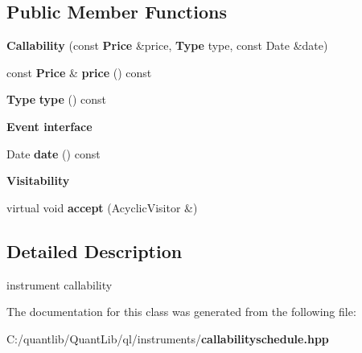 \subsection*{Public Member Functions}
\begin{DoxyCompactItemize}
\item 
{\bfseries Callability} (const {\bf Price} \&price, {\bf Type} type, const Date \&date)\label{class_quant_lib_1_1_callability_ad228bde23a2d0b46caebd1ea15fd30c5}

\item 
const {\bf Price} \& {\bfseries price} () const \label{class_quant_lib_1_1_callability_a6adadeb5414e06999c297d531730dc21}

\item 
{\bf Type} {\bfseries type} () const \label{class_quant_lib_1_1_callability_a9be4cb1b8e8355bdf035408972e098fa}

\end{DoxyCompactItemize}
\begin{Indent}{\bf Event interface}\par
\begin{DoxyCompactItemize}
\item 
Date {\bfseries date} () const \label{class_quant_lib_1_1_callability_a219712d701b779bf8c69c73f2c20e2e8}

\end{DoxyCompactItemize}
\end{Indent}
\begin{Indent}{\bf Visitability}\par
\begin{DoxyCompactItemize}
\item 
virtual void {\bfseries accept} (Acyclic\+Visitor \&)\label{class_quant_lib_1_1_callability_a03dbbd31ce703dace42bb623d10daa27}

\end{DoxyCompactItemize}
\end{Indent}


\subsection{Detailed Description}
instrument callability 

The documentation for this class was generated from the following file\+:\begin{DoxyCompactItemize}
\item 
C\+:/quantlib/\+Quant\+Lib/ql/instruments/{\bf callabilityschedule.\+hpp}\end{DoxyCompactItemize}
